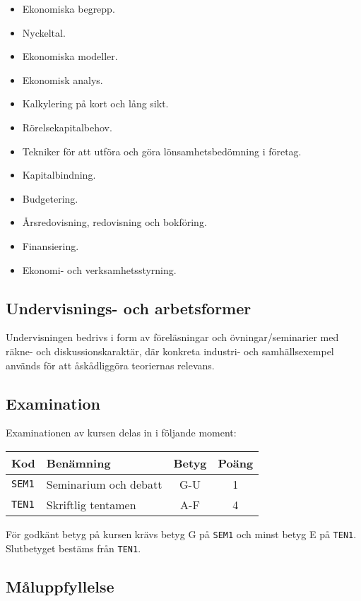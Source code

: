 \begin{itemize}
\tightlist
\item
  Ekonomiska begrepp.
\item
  Nyckeltal.
\item
  Ekonomiska modeller.
\item
  Ekonomisk analys.
\item
  Kalkylering på kort och lång sikt.
\item
  Rörelsekapitalbehov.
\item
  Tekniker för att utföra och göra lönsamhetsbedömning i företag.
\item
  Kapitalbindning.
\item
  Budgetering.
\item
  Årsredovisning, redovisning och bokföring.
\item
  Finansiering.
\item
  Ekonomi- och verksamhetsstyrning.
\end{itemize}

\subsection*{Undervisnings- och
arbetsformer}

Undervisningen bedrivs i form av föreläsningar och övningar/seminarier
med räkne- och diskussionskaraktär, där konkreta industri- och
samhällsexempel används för att åskådliggöra teoriernas relevans.

\subsection*{Examination}

Examinationen av kursen delas in i följande moment:

\begin{longtable}[]{@{}llcc@{}}
\toprule
\textsf{Kod} & \textsf{Benämning} & \textsf{Betyg} & \textsf{Poäng}\tabularnewline
\midrule
\endhead
\texttt{SEM1} & Seminarium och debatt & G-U & 1\tabularnewline
\texttt{TEN1} & Skriftlig tentamen & A-F & 4\tabularnewline
\bottomrule
\end{longtable}

För godkänt betyg på kursen krävs betyg G på \texttt{SEM1} och minst betyg E på
\texttt{TEN1}. Slutbetyget bestäms från \texttt{TEN1}.

\subsection*{Måluppfyllelse}

